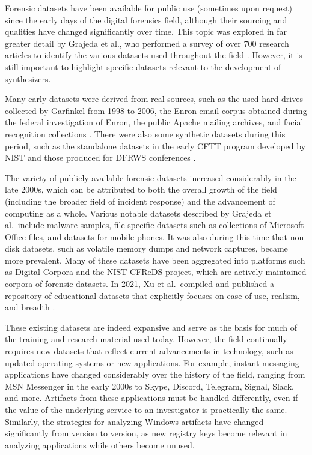\documentclass[final,5p,times,twocolumn]{elsarticle}
\begin{document}
Forensic datasets have been available for public use (sometimes upon
request) since the early days of the digital forensics field, although
their sourcing and qualities have changed significantly over time. This
topic was explored in far greater detail by Grajeda et al., who
performed a survey of over 700 research articles to identify the various
datasets used throughout the field
\cite{grajedaAvailabilityDatasetsDigital2017}. However, it is still
important to highlight specific datasets relevant to the development of
synthesizers.

Many early datasets were derived from real sources, such as the used
hard drives collected by Garfinkel from 1998 to 2006, the Enron email
corpus obtained during the federal investigation of Enron, the public
Apache mailing archives, and facial recognition collections
\cite{garfinkelForensicCorporaChallenge2007,grajedaAvailabilityDatasetsDigital2017,yannikosDataCorporaDigital2014,ricanekMORPHLongitudinalImage2006}.
There were also some synthetic datasets during this period, such as the
standalone datasets in the early CFTT program developed by NIST and
those produced for DFRWS conferences
\cite{woodsCreatingRealisticCorpora2011}.

The variety of publicly available forensic datasets increased
considerably in the late 2000s, which can be attributed to both the
overall growth of the field (including the broader field of incident
response) and the advancement of computing as a whole. Various notable
datasets described by Grajeda et al.~include malware samples,
file-specific datasets such as collections of Microsoft Office files,
and datasets for mobile phones. It was also during this time that
non-disk datasets, such as volatile memory dumps and network captures,
became more prevalent. Many of these datasets have been aggregated into
platforms such as Digital Corpora
\cite{garfinkelBringingScienceDigital2009,yannikosDataCorporaDigital2014}
and the NIST CFReDS project, which are actively maintained corpora of
forensic datasets. In 2021, Xu et al.~compiled and published a
repository of educational datasets that explicitly focuses on ease of
use, realism, and breadth \cite{xuDesigningSharedDigital2022}.

These existing datasets are indeed expansive and serve as the basis for
much of the training and research material used today. However, the
field continually requires new datasets that reflect current
advancements in technology, such as updated operating systems or new
applications. For example, instant messaging applications have changed
considerably over the history of the field, ranging from MSN Messenger
in the early 2000s to Skype, Discord, Telegram, Signal, Slack, and more.
Artifacts from these applications must be handled differently, even if
the value of the underlying service to an investigator is practically
the same. Similarly, the strategies for analyzing Windows artifacts have
changed significantly from version to version, as new registry keys
become relevant in analyzing applications while others become unused.
\end{document}
